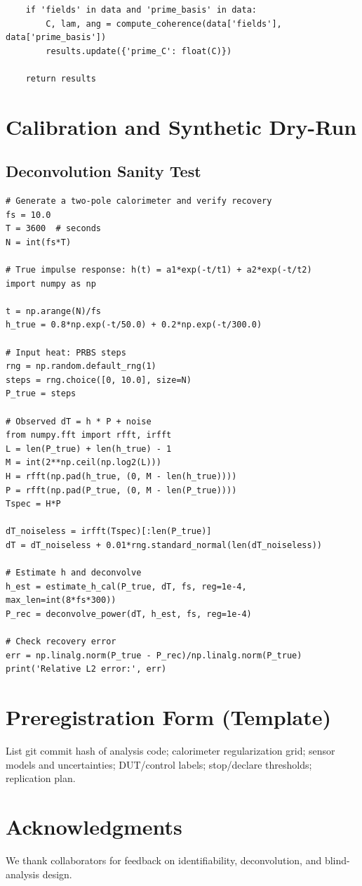 \documentclass[11pt]{article}
\theoremstyle{remark}
\begin{document}
\begin{lstlisting}
    if 'fields' in data and 'prime_basis' in data:
        C, lam, ang = compute_coherence(data['fields'], data['prime_basis'])
        results.update({'prime_C': float(C)})

    return results
\end{lstlisting}

\section{Calibration and Synthetic Dry-Run}
\subsection{Deconvolution Sanity Test}
\lstset{style=code,language=Python}
\begin{lstlisting}
# Generate a two-pole calorimeter and verify recovery
fs = 10.0
T = 3600  # seconds
N = int(fs*T)

# True impulse response: h(t) = a1*exp(-t/t1) + a2*exp(-t/t2)
import numpy as np

t = np.arange(N)/fs
h_true = 0.8*np.exp(-t/50.0) + 0.2*np.exp(-t/300.0)

# Input heat: PRBS steps
rng = np.random.default_rng(1)
steps = rng.choice([0, 10.0], size=N)
P_true = steps

# Observed dT = h * P + noise
from numpy.fft import rfft, irfft
L = len(P_true) + len(h_true) - 1
M = int(2**np.ceil(np.log2(L)))
H = rfft(np.pad(h_true, (0, M - len(h_true))))
P = rfft(np.pad(P_true, (0, M - len(P_true))))
Tspec = H*P

dT_noiseless = irfft(Tspec)[:len(P_true)]
dT = dT_noiseless + 0.01*rng.standard_normal(len(dT_noiseless))

# Estimate h and deconvolve
h_est = estimate_h_cal(P_true, dT, fs, reg=1e-4, max_len=int(8*fs*300))
P_rec = deconvolve_power(dT, h_est, fs, reg=1e-4)

# Check recovery error
err = np.linalg.norm(P_true - P_rec)/np.linalg.norm(P_true)
print('Relative L2 error:', err)
\end{lstlisting}

\section{Preregistration Form (Template)}
List git commit hash of analysis code; calorimeter regularization grid; sensor models and uncertainties; DUT/control labels; stop/declare thresholds; replication plan.

\section*{Acknowledgments}
We thank collaborators for feedback on identifiability, deconvolution, and blind-analysis design.
\nocite{*}


\end{document}

